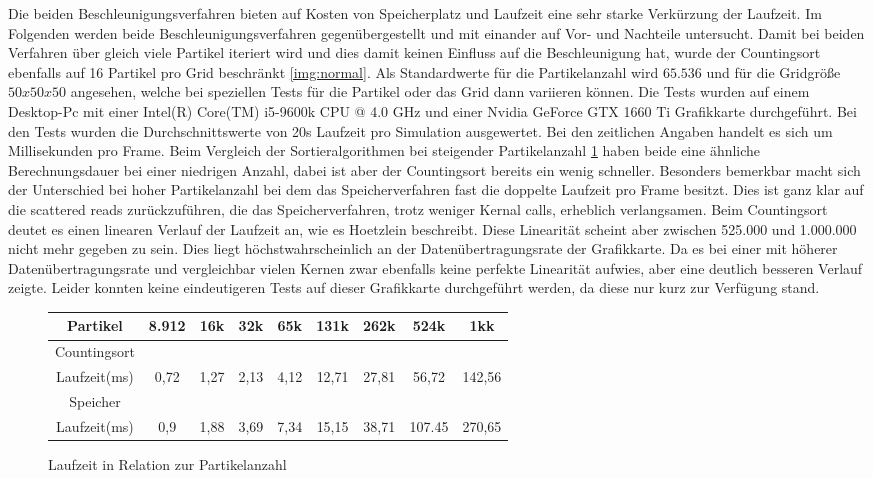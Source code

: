 \documentclass[intern,palatino]{cgBA}
\begin{document}
Die beiden Beschleunigungsverfahren bieten auf Kosten von Speicherplatz und Laufzeit eine sehr starke Verkürzung der Laufzeit. Im Folgenden werden beide Beschleunigungsverfahren gegenübergestellt und mit einander auf Vor- und Nachteile untersucht.
\newline
Damit bei beiden Verfahren über gleich viele Partikel iteriert wird und dies damit keinen Einfluss auf die Beschleunigung hat, wurde der Countingsort ebenfalls auf 16 Partikel pro Grid beschränkt \ref{img:normal}. Als Standardwerte für die Partikelanzahl wird $65.536$ und für die Gridgröße $50x50x50$ angesehen, welche bei speziellen Tests für die Partikel oder das Grid dann variieren können.
\newline
Die Tests wurden auf einem Desktop-Pc mit einer Intel(R) Core(TM) i5-9600k CPU @ 4.0 GHz und einer Nvidia GeForce GTX 1660 Ti Grafikkarte durchgeführt. Bei den Tests wurden die Durchschnittswerte von 20s Laufzeit pro Simulation ausgewertet. Bei den zeitlichen Angaben handelt es sich um Millisekunden pro Frame.
\newline
Beim Vergleich der Sortieralgorithmen bei steigender Partikelanzahl \ref{tab:particle} haben beide eine ähnliche Berechnungsdauer bei einer niedrigen Anzahl, dabei ist aber der Countingsort bereits ein wenig schneller. Besonders bemerkbar macht sich der Unterschied bei hoher Partikelanzahl bei dem das Speicherverfahren fast die doppelte Laufzeit pro Frame besitzt. Dies ist ganz klar auf die scattered reads zurückzuführen, die das Speicherverfahren, trotz weniger Kernal calls, erheblich verlangsamen. Beim Countingsort deutet es einen linearen Verlauf der Laufzeit an, wie es Hoetzlein \cite{nvidia} beschreibt. Diese Linearität scheint aber zwischen 525.000 und 1.000.000 nicht mehr gegeben zu sein. Dies liegt höchstwahrscheinlich an der Datenübertragungsrate der Grafikkarte. Da es bei einer mit höherer Datenübertragungsrate und vergleichbar vielen Kernen zwar ebenfalls keine perfekte Linearität aufwies, aber eine deutlich besseren Verlauf zeigte. Leider konnten keine eindeutigeren Tests auf dieser Grafikkarte durchgeführt werden, da diese nur kurz zur Verfügung stand.  
\newline

\begin{figure}[H]
	\centering
	\begin{tabular}{ | c || c | c | c | c | c | c | c | c |}
		\hline
		Partikel			&  8.912 & 16k & 32k & 65k & 131k & 262k & 524k & 1kk	\\ \hline
		Countingsort														\\ \hline
		Laufzeit(ms)		&   0,72 &  1,27 &  2,13 &  4,12 &  12,71 &  27,81 &  56,72 &  142,56		 	\\ \hline
		
		Speicher															\\ \hline
		Laufzeit(ms)		&   0,9 &  1,88 &  3,69 &  7,34 &  15,15 &  38,71 &  107.45 &  270,65	\\
		\hline
	\end{tabular}
	\caption{Laufzeit in Relation zur Partikelanzahl}
	\label{tab:particle}
\end{figure}
\end{document}
